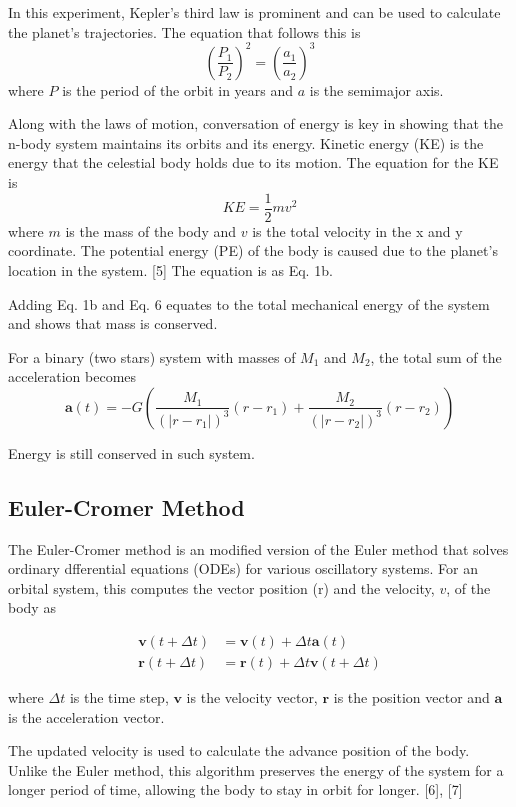 \documentclass[11 pt, a4paper]{article}
\begin{document}
In this experiment, Kepler's third law is prominent and can be used to calculate the planet's trajectories. The equation that follows this is
\[
\left(\frac{P_1}{P_2}\right)^2 = \left(\frac{a_1}{a_2}\right)^3
\tag{Eq. 5}
\]
where $P$ is the period of the orbit in years and $a$ is the semimajor axis.

Along with the laws of motion, conversation of energy is key in showing that the n-body system maintains its orbits and its
energy. Kinetic energy (KE) is the energy that the celestial body holds due to its motion. The equation for the KE is
\[
KE = \frac{1}{2}mv^2
\tag{Eq. 6}
\]
where $m$ is the mass of the body and $v$ is the total velocity in the x and y coordinate. The potential energy (PE) of the body is caused due
to the planet's location in the system. [5] The equation is as Eq. 1b.

Adding Eq. 1b and Eq. 6 equates to the total mechanical energy of the system and shows that mass is conserved.

For a binary (two stars) system with masses of $M_1$ and $M_2$, the total sum of the acceleration becomes
\[
\mathbf{a}(t) = -G\left(\frac{M_1}{(|r - r_1|)^3}(r - r_1) + \frac{M_2}{(|r - r_2|)^3}(r - r_2)\right)
\tag{Eq. 7}
\]

Energy is still conserved in such system.

\subsection{Euler-Cromer Method}
The Euler-Cromer method is an modified version of the Euler method that solves ordinary dfferential equations (ODEs) for various oscillatory 
systems. For an orbital system, this computes the vector position (r) and the velocity, $v$, of the body as

\begin{align}
\mathbf{v}(t+\Delta t) &= \mathbf{v}(t) + \Delta t\mathbf{a}(t) \tag{Eq. 8a}\\
\mathbf{r}(t+\Delta t) &= \mathbf{r}(t) + \Delta t\mathbf{v}(t+\Delta t) \tag{8b}
\end{align}

where $\Delta t$ is the time step, $\mathbf{v}$ is the velocity vector, $\mathbf{r}$ is the position vector and $\mathbf{a}$ is the 
acceleration vector.

The updated velocity is used to calculate the advance position of the body. Unlike the Euler method, this algorithm preserves the energy 
of the system for a longer period of time, allowing the body to stay in orbit for longer. [6], [7]
\end{document}
